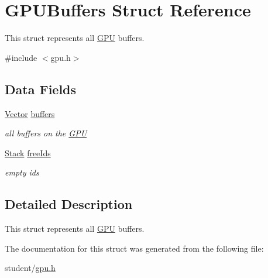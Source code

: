 \hypertarget{structGPUBuffers}{}\section{G\+P\+U\+Buffers Struct Reference}
\label{structGPUBuffers}


This struct represents all \hyperlink{structGPU}{G\+PU} buffers.  




{\ttfamily \#include $<$gpu.\+h$>$}

\subsection*{Data Fields}
\begin{DoxyCompactItemize}
\item 
\mbox{\label{structGPUBuffers_ad055aeac8b3fb7ebb91df29046849f13}} 
\hyperlink{structVector}{Vector} \hyperlink{structGPUBuffers_ad055aeac8b3fb7ebb91df29046849f13}{buffers}
\begin{DoxyCompactList}\small\item\em all buffers on the \hyperlink{structGPU}{G\+PU} \end{DoxyCompactList}\item 
\mbox{\label{structGPUBuffers_a6fbf426a0e1e2755cc093568fdc8f82b}} 
\hyperlink{structStack}{Stack} \hyperlink{structGPUBuffers_a6fbf426a0e1e2755cc093568fdc8f82b}{free\+Ids}
\begin{DoxyCompactList}\small\item\em empty ids \end{DoxyCompactList}\end{DoxyCompactItemize}


\subsection{Detailed Description}
This struct represents all \hyperlink{structGPU}{G\+PU} buffers. 

The documentation for this struct was generated from the following file\+:\begin{DoxyCompactItemize}
\item 
student/\hyperlink{gpu_8h}{gpu.\+h}\end{DoxyCompactItemize}

